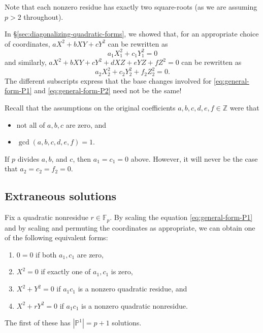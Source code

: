 \documentclass[10pt,a4paper]{amsart}
\numberwithin{equation}{section}
\numberwithin{figure}{section}
\theoremstyle{definition}
\theoremstyle{remark}
\theoremstyle{plain}
\theoremstyle{plain}
\theoremstyle{definition}
\theoremstyle{plain}
\theoremstyle{plain}
\renewcommand{\P}{\mathbb{P}}
\newcommand{\F}{\mathbb{F}}
\newcommand{\Z}{\mathbb{Z}}
\begin{document}
	Note that each nonzero residue has exactly two square-roots (as we are assuming
	$p > 2$ throughout).
	
	In \S\ref{sec:diagonalizing-quadratic-forms}, we showed that, for an
	appropriate choice of coordinates, $aX^2 + bXY + cY^2$ can be rewritten as
	\begin{equation}\label{eq:general-form-P1} 
	a_1 X_1^2 + c_1 Y_1^2 = 0
	\end{equation} 
	and similarly, $aX^2 + bXY + cY^2 + dXZ + eYZ + fZ^2 = 0$ can be
	rewritten as 
	\begin{equation}\label{eq:general-form-P2} 
	a_2 X_2^2 + c_2 Y_2^2 + f_2 Z_2^2 = 0.
	\end{equation}
	The different subscripts express that the base
	changes involved for \eqref{eq:general-form-P1} and \eqref{eq:general-form-P2}
	need not be the same!
	
	Recall that the assumptions on the original coefficients 
	$a,b,c,d,e,f \in \Z$ were that 
	\begin{itemize} 
		\item not all of $a,b,c$ are zero, and
		\item $\gcd(a,b,c,d,e,f) = 1$.  
	\end{itemize} 
	If $p$ divides $a,b$, and $c$, then $a_1 = c_1 = 0$ above. However, 
	it will never be the case that $a_2 = c_2 = f_2 = 0$.
	
	\subsection{Extraneous solutions}
	\label{subsec:counting-P1-solutions}
	
	Fix a quadratic nonresidue $r \in \F_p$. By scaling the equation
	\eqref{eq:general-form-P1} and by scaling and permuting the coordinates as
	appropriate, we can obtain one of the following equivalent forms:
	\begin{enumerate} 
		\item $0 = 0$ if both $a_1, c_1$ are zero, 
		\item $X^2 = 0$ if exactly one of $a_1, c_1$ is zero, 
		\item $X^2 + Y^2 = 0$ if $a_1 c_1$ is a nonzero quadratic residue, and \label{case:x^2+y^2=0}
		\item $X^2 + rY^2 = 0$ if $a_1 c_1$ is a nonzero quadratic nonresidue.  
	\end{enumerate}
	
	The first of these has $|\P^1| = p+1$ solutions. 
	
\end{document}
